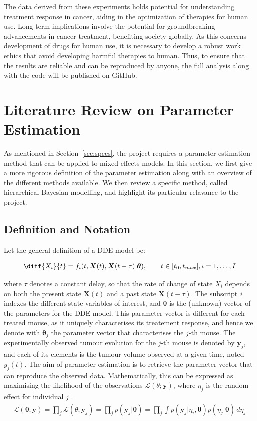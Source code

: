 \documentclass[11pt]{article}
\begin{document}
The data derived from these experiments holds potential for understanding treatment response in cancer, aiding in the optimization of therapies for human use. Long-term implications involve the potential for groundbreaking advancements in cancer treatment, benefiting society globally. As this concerns development of drugs for human use, it is necessary to develop a robust work ethics that avoid developing harmful therapies to human. Thus, to ensure that the results are reliable and can be reproduced by anyone, the full analysis along with the code will be published on GitHub.

\section{Literature Review on Parameter Estimation}\label{sec:littrev}

As mentioned in Section~\ref{sec:specs}, the project requires a parameter estimation method that can be applied to mixed-effects models. In this section, we first give a more rigorous definition of the parameter estimation along with an overview of the different methods available. We then review a specific method, called hierarchical Bayesian modelling, and highlight its particular relavance to the project. 

\subsection{Definition and Notation}
Let the general definition of a DDE model be: 

\begin{align*}
    \diff{X_i}{t} = f_i(t, \boldsymbol{X}(t), \boldsymbol{X}(t-\tau)| \boldsymbol{\theta}), \qquad t \in [t_0, t_{max}], i = 1, \ldots, I
\end{align*}

where $\tau$ denotes a constant delay, so that the rate of change of state $X_i$ depends on both the present state $\boldsymbol{X}(t)$ and a past state $\boldsymbol{X}(t-\tau)$. The subscript \textit{i} indexes the different state variables of interest, and $\boldsymbol{\theta}$ is the (unknown) vector of the parameters for the DDE model. This parameter vector is different for each treated mouse, as it uniquely characterises its treatement response, and hence we denote with $\boldsymbol{\theta}_j$ the parameter vector that characterises the $j$-th mouse. The experimentally observed tumour evolution for the $j$-th mouse is denoted by $\boldsymbol{y}_j$, and each of its elements is the tumour volume observed at a given time, noted $y_{j}(t)$. The aim of parameter estimation is to retrieve the parameter vector that can reproduce the observed data. Mathematically, this can be expressed as maximising the likelihood of the observations $\mathcal{L}(\theta;\boldsymbol{y})$, where $\eta_j$ is the random effect for individual $j$ \cite{SAEM}. 
\begin{align*}
    \mathcal{L}(\boldsymbol{\theta};\boldsymbol{y})=\prod_{j} \mathcal{L}(\theta;\boldsymbol{y}_j)=\prod_j p(\boldsymbol{y}_j\vert \boldsymbol{\theta})=\prod_j \int p(\boldsymbol{y}_j\vert \eta_i,\boldsymbol{\theta})p(\eta_j\vert \boldsymbol{\theta}) \,d\eta_j
\end{align*}
\end{document}
